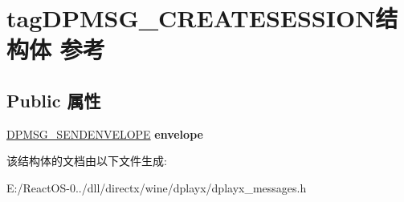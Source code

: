 \hypertarget{structtag_d_p_m_s_g___c_r_e_a_t_e_s_e_s_s_i_o_n}{}\section{tag\+D\+P\+M\+S\+G\+\_\+\+C\+R\+E\+A\+T\+E\+S\+E\+S\+S\+I\+O\+N结构体 参考}
\label{structtag_d_p_m_s_g___c_r_e_a_t_e_s_e_s_s_i_o_n}
\subsection*{Public 属性}
\begin{DoxyCompactItemize}
\item 
\mbox{\label{structtag_d_p_m_s_g___c_r_e_a_t_e_s_e_s_s_i_o_n_a424ee17647857b5ca3f03101aa153051}} 
\hyperlink{structtag_d_p_m_s_g___s_e_n_d_e_n_v_e_l_o_p_e}{D\+P\+M\+S\+G\+\_\+\+S\+E\+N\+D\+E\+N\+V\+E\+L\+O\+PE} {\bfseries envelope}
\end{DoxyCompactItemize}


该结构体的文档由以下文件生成\+:\begin{DoxyCompactItemize}
\item 
E\+:/\+React\+O\+S-\/0../dll/directx/wine/dplayx/dplayx\+\_\+messages.\+h\end{DoxyCompactItemize}
